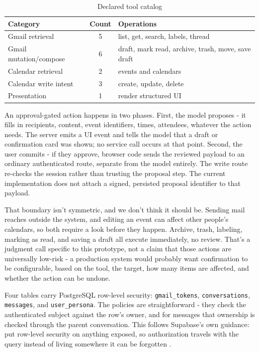 \documentclass[conference]{IEEEtran}
\begin{document}
\begin{table}[t]
\centering
\caption{Declared tool catalog}
\scriptsize
\begin{tabularx}{\columnwidth}{@{}YcY@{}}
\toprule
\textbf{Category} & \textbf{Count} & \textbf{Operations} \\
\midrule
Gmail retrieval & 5 & list, get, search, labels, thread \\
Gmail mutation/compose & 6 & draft, mark read, archive, trash, move, save draft \\
Calendar retrieval & 2 & events and calendars \\
Calendar write intent & 3 & create, update, delete \\
Presentation & 1 & render structured UI \\
\bottomrule
\end{tabularx}
\end{table}

An approval-gated action happens in two phases. First, the model proposes - it fills in recipients, content, event identifiers, times, attendees, whatever the action needs. The server emits a UI event and tells the model that a draft or confirmation card was shown; no service call occurs at that point. Second, the user commits - if they approve, browser code sends the reviewed payload to an ordinary authenticated route, separate from the model entirely. The write route re-checks the session rather than trusting the proposal step. The current implementation does not attach a signed, persisted proposal identifier to that payload.

That boundary isn't symmetric, and we don't think it should be. Sending mail reaches outside the system, and editing an event can affect other people's calendars, so both require a look before they happen. Archive, trash, labeling, marking as read, and saving a draft all execute immediately, no review. That's a judgment call specific to this prototype, not a claim that those actions are universally low-risk - a production system would probably want confirmation to be configurable, based on the tool, the target, how many items are affected, and whether the action can be undone.

Four tables carry PostgreSQL row-level security: \texttt{gmail\_tokens}, \texttt{conversations}, \texttt{messages}, and \texttt{user\_persona}. The policies are straightforward - they check the authenticated subject against the row's owner, and for messages that ownership is checked through the parent conversation. This follows Supabase's own guidance: put row-level security on anything exposed, so authorization travels with the query instead of living somewhere it can be forgotten \cite{supabaseryls}.
\end{document}

